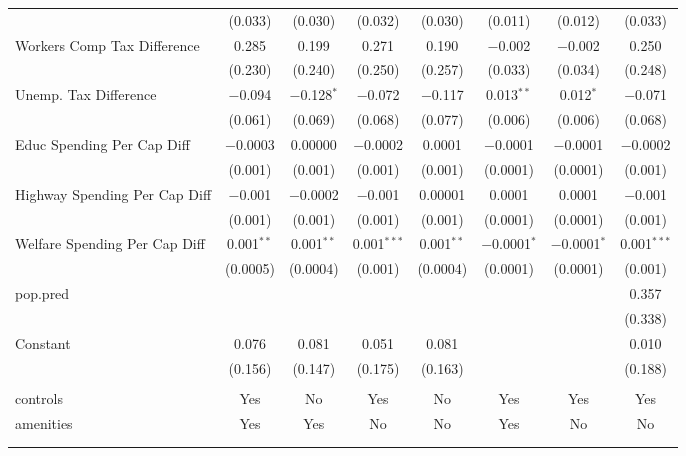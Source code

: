 \begin{table}[!htbp]
\begin{tabular}{@{\extracolsep{5pt}}lccccccc}
  & (0.033) & (0.030) & (0.032) & (0.030) & (0.011) & (0.012) & (0.033) \\ 
  Workers Comp Tax Difference & 0.285 & 0.199 & 0.271 & 0.190 & $-$0.002 & $-$0.002 & 0.250 \\ 
  & (0.230) & (0.240) & (0.250) & (0.257) & (0.033) & (0.034) & (0.248) \\ 
  Unemp. Tax Difference & $-$0.094 & $-$0.128$^{*}$ & $-$0.072 & $-$0.117 & 0.013$^{**}$ & 0.012$^{*}$ & $-$0.071 \\ 
  & (0.061) & (0.069) & (0.068) & (0.077) & (0.006) & (0.006) & (0.068) \\ 
  Educ Spending Per Cap Diff & $-$0.0003 & 0.00000 & $-$0.0002 & 0.0001 & $-$0.0001 & $-$0.0001 & $-$0.0002 \\ 
  & (0.001) & (0.001) & (0.001) & (0.001) & (0.0001) & (0.0001) & (0.001) \\ 
  Highway Spending Per Cap Diff & $-$0.001 & $-$0.0002 & $-$0.001 & 0.00001 & 0.0001 & 0.0001 & $-$0.001 \\ 
  & (0.001) & (0.001) & (0.001) & (0.001) & (0.0001) & (0.0001) & (0.001) \\ 
  Welfare Spending Per Cap Diff & 0.001$^{**}$ & 0.001$^{**}$ & 0.001$^{***}$ & 0.001$^{**}$ & $-$0.0001$^{*}$ & $-$0.0001$^{*}$ & 0.001$^{***}$ \\ 
  & (0.0005) & (0.0004) & (0.001) & (0.0004) & (0.0001) & (0.0001) & (0.001) \\ 
  pop.pred &  &  &  &  &  &  & 0.357 \\ 
  &  &  &  &  &  &  & (0.338) \\ 
  Constant & 0.076 & 0.081 & 0.051 & 0.081 &  &  & 0.010 \\ 
  & (0.156) & (0.147) & (0.175) & (0.163) &  &  & (0.188) \\ 
 \hline \\[-1.8ex] 
controls & Yes & No & Yes & No & Yes & Yes & Yes \\ 
amenities & Yes & Yes & No & No & Yes & No & No \\ 
\hline \\[-1.8ex] 
\hline 
\hline \\[-1.8ex] 
\end{tabular} 
\end{table} 
